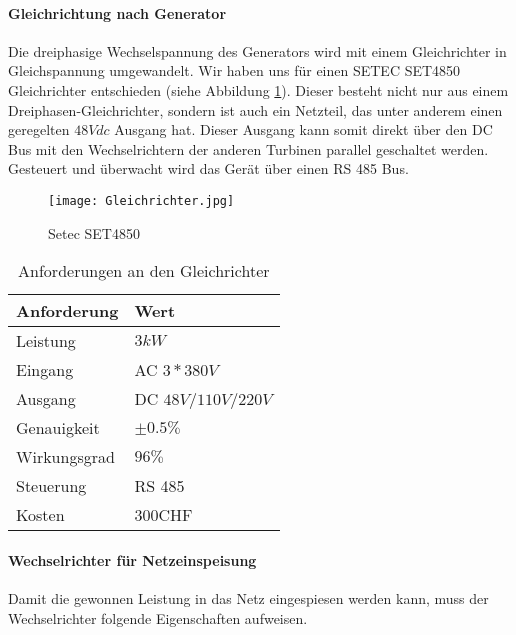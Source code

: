 \paragraph{Gleichrichtung nach Generator}

Die dreiphasige Wechselspannung des Generators wird mit einem Gleichrichter in Gleichspannung umgewandelt. Wir haben uns für einen SETEC SET4850 Gleichrichter entschieden (siehe Abbildung \ref{fig:Gleichrichter}). Dieser besteht nicht nur aus einem Dreiphasen-Gleichrichter, sondern ist auch ein Netzteil, das unter anderem einen geregelten \(48Vdc\) Ausgang hat. Dieser Ausgang kann somit direkt über den DC Bus mit den Wechselrichtern der anderen Turbinen parallel geschaltet werden. Gesteuert und überwacht wird das Gerät über einen RS 485 Bus.

\begin{figure}[H]
\centering
\texttt{[image: Gleichrichter.jpg]}
\caption{Setec SET4850 \cite{gleichrichter}}
\label{fig:Gleichrichter}
\end{figure}

\begin{table}[H]
\small
\begin{center}
\begin{tabular}{ll}
\hline
\textbf{Anforderung}&\textbf{Wert}\\
\hline
Leistung&\(3 kW\)\\
Eingang&AC \(3 * 380V\)\\
Ausgang&DC \(48V/110V/220V\)\\
Genauigkeit&\(\pm 0.5 \%\)\\
Wirkungsgrad&\(96\%\)\\
Steuerung&RS 485\\
Kosten&300CHF\\
\hline
\end{tabular}
\caption{Anforderungen an den Gleichrichter}
\end{center}
\end{table}



\paragraph{Wechselrichter für Netzeinspeisung} \label{par:WechselrichterNetz}

Damit die gewonnen Leistung in das Netz eingespiesen werden kann, muss der Wechselrichter folgende Eigenschaften aufweisen. 

